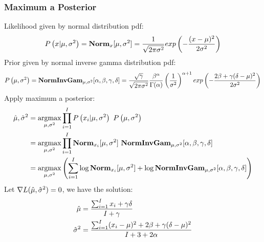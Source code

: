 \subsubsection*{Maximum a Posterior}
Likelihood given by normal distribution pdf:
	\begin{align*}
	P\left(x|\mu,\sigma^2\right)=\mathbf{Norm}_x[\mu,\sigma^2]=\frac{1}{\sqrt{2\pi\sigma^2}}exp\left(-\frac{(x-\mu)^2}{2\sigma^2}\right)
	\end{align*}
Prior given by normal inverse gamma distribution pdf:
	\begin{align*}
	P\left(\mu,\sigma^2\right)=\mathbf{NormInvGam}_{\mu,\sigma^2}[\alpha,\beta,\gamma,\delta]=\frac{\sqrt{\gamma}}{\sqrt{2\pi\sigma^2}}\frac{\beta^\alpha}{\Gamma(\alpha)}\left(\frac{1}{\sigma^2}\right)^{\alpha+1}exp\left(-\frac{2\beta+\gamma(\delta-\mu)^2}{2\sigma^2}\right)
	\end{align*}
Apply maximum a posterior:
	\begin{align*}
	\hat{\mu},\hat{\si}^2&=\argmax_{\mu,\si^2}\prod_{i=1}^I\P{x_i|\mu,\si^2}\ \P{\mu,\si^2} \\
	&=\argmax_{\mu,\si^2}\prod_{i=1}^I\Norm_{x_i}[\mu,\si^2]\ \NIG_{\mu,\si^2}[\al,\be,\ga,\de] \\
	&=\argmax_{\mu,\si^2}\left(\sum_{i=1}^I\log\Norm_{x_i}[\mu,\si^2]+\log\NIG_{\mu,\si^2}[\al,\be,\ga,\de]\right)
	\end{align*}
Let $\nabla L(\hat{\mu},\hat{\sigma}^2)=0$, we have the solution:
	\begin{align*}
	\hat{\mu}&=\frac{\sum_{i=1}^Ix_i+\gamma\delta}{I+\gamma} \\
	\hat{\sigma}^2&=\frac{\sum_{i=1}^I(x_i-\mu)^2+2\beta+\gamma(\delta-\mu)^2}{I+3+2\alpha}
	\end{align*}

